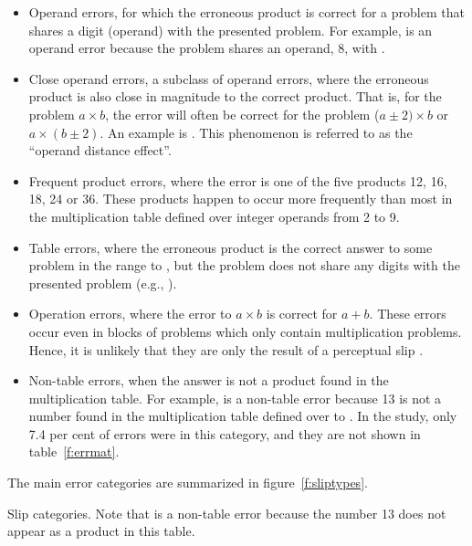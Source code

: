 \begin{itemize}

\item Operand errors, for which the erroneous product is correct for a
problem that shares a digit (operand) with the presented problem. For
example,  is an operand error because the problem shares
an operand, 8, with .

\item Close operand errors, a subclass of operand errors, where the
erroneous product is also close in magnitude to the correct product. That
is, for the problem $a\times b$, the error will often be correct for the
problem ($a\pm2) \times b$ or $a \times (b\pm2)$. An example is
. This phenomenon is referred to as the ``operand distance
effect''.

\item Frequent product errors, where the error is
one of the five products 12, 16, 18, 24 or 36.  These products happen to
occur more frequently than most in the multiplication table
defined over integer operands from 2 to 9.

\item Table errors, where the erroneous product is the correct answer to
some problem in the range  to , but the problem does not share any
digits with the presented problem (e.g., ).

\item Operation errors, where the error to $a\times b$ is correct for
$a+b$.  These errors occur even in blocks of problems
which only contain multiplication problems.  Hence, it is unlikely that
they are only the result of a perceptual slip \cite{winkasso}.

\item Non-table errors, when the answer is not a product found in the
multiplication table.  For example,  is a non-table error
because
13 is not a number found in the multiplication table defined over  to
.  In the \citeauthor{camp85} study, only 7.4 per cent of errors were
in this category, and they are not shown in table~\ref{f:errmat}.
\end{itemize}
The main error categories are summarized in figure~\ref{f:sliptypes}.

\begin{fancyfigure}
\centerline{}
\caption{Slip categories.  Note that  is a non-table error
because
the number 13 does not appear as a product in this table.}
\label{f:sliptypes}
\end{fancyfigure}

